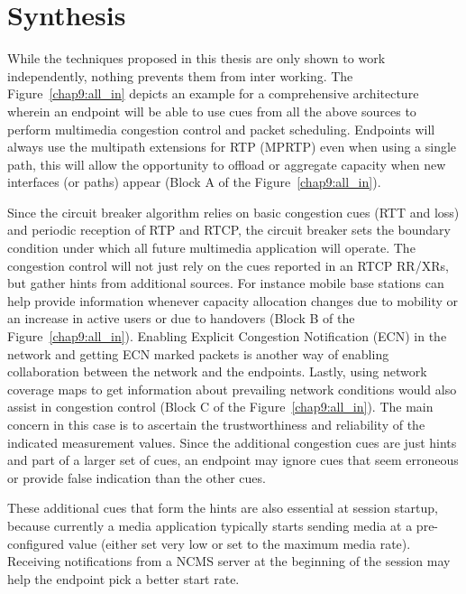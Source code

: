 \section{Synthesis}

While the techniques proposed in this thesis are only shown to work
independently, nothing prevents them from inter working. The
Figure~\ref{chap9:all_in} depicts an example for a comprehensive architecture
wherein an endpoint will be able to use cues from all the above sources to
perform multimedia congestion control and packet scheduling. Endpoints will
always use the multipath extensions for RTP (MPRTP) even when using a single
path, this will allow the opportunity to offload or aggregate capacity when
new interfaces (or paths) appear (Block A of the Figure~\ref{chap9:all_in}).

Since the circuit breaker algorithm relies on basic congestion cues (RTT and
loss) and periodic reception of RTP and RTCP, the circuit breaker sets the
boundary condition under which all future multimedia application will operate.
The congestion control will not just rely on the cues reported in an RTCP
RR/XRs, but gather hints from additional sources. For instance mobile base
stations can help provide information whenever capacity allocation changes due
to mobility or an increase in active users or due to handovers (Block B of the
Figure~\ref{chap9:all_in}). Enabling Explicit Congestion Notification (ECN) in
the network and getting ECN marked packets is another way of enabling
collaboration between the network and the endpoints. Lastly, using network
coverage maps to get information about prevailing network conditions would
also assist in congestion control (Block C of the Figure~\ref{chap9:all_in}).
The main concern in this case is to ascertain the trustworthiness and
reliability of the indicated measurement values. Since the additional
congestion cues are just hints and part of a larger set of cues, an endpoint
may ignore cues that seem erroneous or provide false indication than the other
cues. 


These additional cues that form the hints are also essential at session
startup, because currently a media application typically starts sending media
at a pre-configured value (either set very low or set to the maximum media
rate). Receiving notifications from a NCMS server at the beginning of the
session may help the endpoint pick a better start rate.


